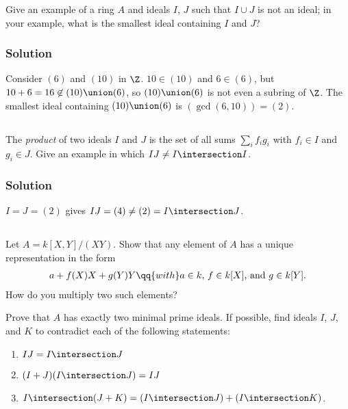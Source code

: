 Give an example of a ring $A$ and ideals $I$, $J$ such that $I \cup J$ is not an ideal; in your example, what is the smallest ideal containing $I$ and $J$?

\subsubsection*{Solution}

Consider $(6)$ and $(10)$ in $\Z$. $10 \in (10)$ and $6 \in (6)$, but $10 + 6 = 16 \not\in (10) \union (6)$, so $(10) \union (6)$ is not even a subring of $\Z$. The smallest ideal containing $(10) \union (6)$ is $\left( \operatorname{gcd}(6, 10) \right) = (2)$.


\subsection{}

The \emph{product} of two ideals $I$ and $J$ is the set of all sums $\sum_i f_i g_i$ with $f_i \in I$ and $g_i \in J$. Give an example in which $I J \neq I \intersection I$.

\subsubsection*{Solution}

$I = J = (2)$ gives $I J = (4) \neq (2) = I \intersection J$.


\subsection{}

Let $A = k[X, Y] / (X Y)$. Show that any element of $A$ has a unique representation in the form
\begin{align}
	a + f(X) X + g(Y) Y \qq{with} a \in k \text{, } f \in k[X] \text{, and } g \in k[Y].
\end{align}
How do you multiply two such elements?

Prove that $A$ has exactly two minimal prime ideals. If possible, find ideals $I$, $J$, and $K$ to contradict each of the following statements:
\begin{enumerate}
	\item $I J = I \intersection J$
	\item $(I + J) (I \intersection J) = I J$
	\item $I \intersection (J + K) = (I \intersection J) + (I \intersection K)$.
\end{enumerate}

